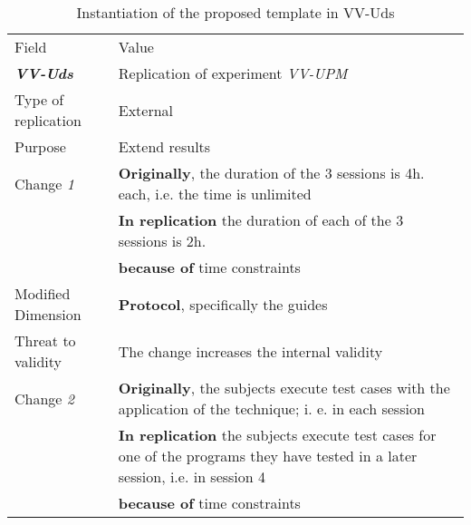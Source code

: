 
\begin{table*}[h]
  \caption{Instantiation of the proposed template in VV-Uds}
\label{tab:plantEng}
  \centering

\begin{tabularx}{\textwidth}{
  >{\hsize=0.3\hsize}X
  >{\hsize=0.8\hsize}X}
  
    \noalign{\smallskip}\hline\noalign{\smallskip}
  
  Field &  Value  \\ 
  \noalign{\smallskip}\hline\noalign{\smallskip}
  
\textbf {\textit{VV-Uds}} &  Replication of experiment \textit{VV-UPM}    \\
Type of replication &  External   \\  
Purpose  &  Extend results \\   \hline

    Change \textit{1}  & \textbf{Originally}, the duration of the 3 sessions is 4h. each, i.e. the time is unlimited \\& \textbf{In replication} the duration of each of the 3 sessions is 2h. \\& \textbf{because of} time constraints \\
    
    
    Modified Dimension & 
   \textbf{Protocol}, specifically the guides  \\ 
    Threat to validity & The change increases the internal validity \\  \hline
    
    Change \textit{2}   & \textbf{Originally}, the subjects execute test cases with the application of the technique; i. e. in each session \\& \textbf{In replication} the subjects execute test cases for one of the programs they have tested in a later session, i.e. in session 4 \\& \textbf{because of} time constraints \\


\end{tabularx}
\end{table*}
